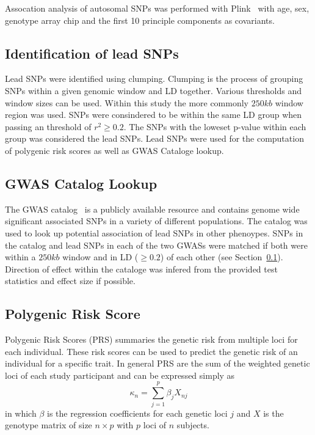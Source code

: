 Assocation analysis of autosomal SNPs was performed with Plink~\cite{Purcell2007,Chang2015} with age, sex, genotype array chip and the first 10 principle components as covariants.

\subsection{Identification of lead SNPs}
\label{sub:Clumping}

Lead SNPs were identified using clumping.
Clumping is the process of grouping SNPs within a given genomic window and LD together.
Various thresholds and window sizes can be used.
Within this study the more commonly $250kb$ window region was used.
SNPs were consindered to be within the same LD group when passing an threshold of $r^2 \ge 0.2$.
The SNPs with the loweset p-value within each group was considered the lead SNPs.
Lead SNPs were used for the computation of polygenic risk scores as well as GWAS Cataloge lookup.

\subsection{GWAS Catalog Lookup}
\label{sub:GWAS_Cataloge_Lookup}

The GWAS catalog~\cite{Welter2014} is a publicly available resource and contains genome wide significant associated SNPs in a variety of different populations.
The catalog was used to look up potential association of lead SNPs in other phenoypes.
SNPs in the catalog and lead SNPs in each of the two GWASs were matched if both were within a $250kb$ window and in LD ($\ge 0.2$) of each other (see Section~\ref{sub:Clumping}).
Direction of effect within the cataloge was infered from the provided test statistics and effect size if possible.

\subsection{Polygenic Risk Score}
\label{sub:prs}

Polygenic Risk Scores (PRS) summaries the genetic risk from multiple loci for each individual.
These risk scores can be used to predict the genetic risk of an individual for a specific trait.
In general PRS are the sum of the weighted genetic loci of each study participant and can be expressed simply as
\begin{equation}
	\kappa_n = \sum^p_{j=1} \beta_j X_{nj}
\end{equation}
in which $\beta$ is the regression coefficients for each genetic loci $j$ and $X$ is the genotype matrix of size  $n\times p$ with $p$ loci of $n$ subjects.

